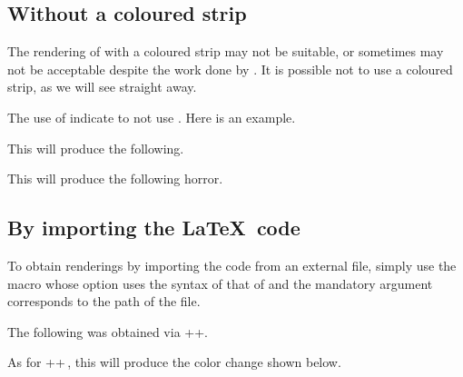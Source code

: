 



\subsection{Without a coloured strip}

The rendering of  with a coloured strip may not be suitable, or sometimes may not be acceptable despite the work done by .
It is possible not to use a coloured strip, as we will see straight away.


\begin{tdocexa}
    The use of  indicate to not use .
    Here is an example.



    This will produce the following.

    \medskip

    

\end{tdocexa}




\begin{tdocexa}
    \leavevmode



    This will produce the following horror.

    \medskip

    

\end{tdocexa}


\subsection{By importing the \LaTeX\ code}

To obtain renderings by importing the code from an external file, simply use the  macro whose option uses the syntax of that of  and the mandatory argument corresponds to the path of the file.


\begin{tdocexa}
    The following was obtained via \tdoclatexin++.

    \medskip



    \medskip

    As for \tdoclatexin++\,, this will produce the color change shown below.

    \medskip


\end{tdocexa}


